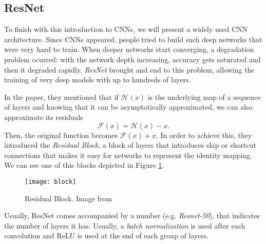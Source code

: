 \subsection{ResNet}

To finish with this introduction to CNNs, we will present a widely used CNN architecture. Since CNNs appeared, people tried to build such deep networks that were very hard to train. When deeper networks start converging, a degradation problem ocurred: with the network depth increasing, accuracy gets saturated and then it degraded rapidly. \emph{ResNet} \citep{he2015deep} brought and end to this problem, allowing the training of very deep models with up to hundreds of layers.

In the paper, they mentioned that if $\mathcal H(x)$ is the underlying map of a sequence of layers and knowing that it can be asymptotically approximated, we can also approximate its residuals
\[
\mathcal F(x) = \mathcal H(x) - x.    
\]
Then, the original function becomes $\mathcal F(x) + x$. In order to achieve this, they introduced the \emph{Residual Block}, a block of layers that introduces skip or shortcut connections that makes it easy for networks to represent the identity mapping. We can see one of this blocks depicted in Figure \ref{fig:resnet:block}.

\begin{figure}[H]
    \centering
    \texttt{[image: block]}
    \caption{Residual Block. Image from \cite{he2015deep} } \label{fig:resnet:block}
\end{figure}

Usually, ResNet comes accompanied by a number (e.g. \emph{Resnet-50}), that indicates the number of layers it has. Usually, a \emph{batch normalization} is used after each convolution and ReLU is used at the end of each group of layers.

